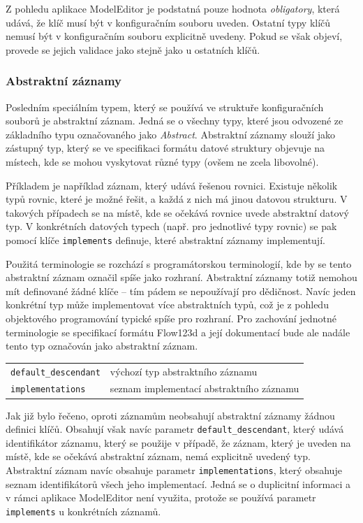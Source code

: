 \documentclass[FM,bw,DP]{tulthesis}
\begin{document}
Z pohledu aplikace ModelEditor je podstatná pouze hodnota \textit{obligatory}, která udává, že klíč musí být v konfiguračním souboru uveden. Ostatní typy klíčů nemusí být v konfiguračním souboru explicitně uvedeny. Pokud se však objeví, provede se jejich validace jako stejně jako u ostatních klíčů.

\subsubsection{Abstraktní záznamy}

Posledním speciálním typem, který se používá ve struktuře konfiguračních souborů je abstraktní záznam. Jedná se o všechny typy, které jsou odvozené ze základního typu označovaného jako \textit{Abstract}. Abstraktní záznamy slouží jako zástupný typ, který se ve specifikaci formátu datové struktury objevuje na místech, kde se mohou vyskytovat různé typy (ovšem ne zcela libovolné).

Příkladem je například záznam, který udává řešenou rovnici. Existuje několik typů rovnic, které je možné řešit, a každá z nich má jinou datovou strukturu. V takových případech se na místě, kde se očekává rovnice uvede abstraktní datový typ. V konkrétních datových typech (např. pro jednotlivé typy rovnic) se pak pomocí klíče \texttt{implements} definuje, které abstraktní záznamy implementují.

Použitá terminologie se rozchází s programátorskou terminologií, kde by se tento abstraktní záznam označil spíše jako rozhraní. Abstraktní záznamy totiž nemohou mít definované žádné klíče -- tím pádem se nepoužívají pro dědičnost. Navíc jeden konkrétní typ může implementovat více abstraktních typů, což je z pohledu objektového programování typické spíše pro rozhraní. Pro zachování jednotné terminologie se specifikací formátu Flow123d a její dokumentací bude ale nadále tento typ označován jako abstraktní záznam.

\vspace{0.5cm}
\begin{tabular}{m{5cm}@{}l}
\texttt{default\_descendant}\dotfill & výchozí typ abstraktního záznamu \\
\texttt{implementations}\dotfill & seznam implementací abstraktního záznamu \\
\end{tabular}
\vspace{0.5cm}

Jak již bylo řečeno, oproti záznamům neobsahují abstraktní záznamy žádnou definici klíčů. Obsahují však navíc parametr \texttt{default\_descendant}, který udává identifikátor záznamu, který se použije v případě, že záznam, který je uveden na místě, kde se očekává abstraktní záznam, nemá explicitně uvedený typ. Abstraktní záznam navíc obsahuje parametr \texttt{implementations}, který obsahuje seznam identifikátorů všech jeho implementací. Jedná se o duplicitní informaci a v rámci aplikace ModelEditor není využita, protože se používá parametr \texttt{implements} u konkrétních záznamů.
\end{document}
